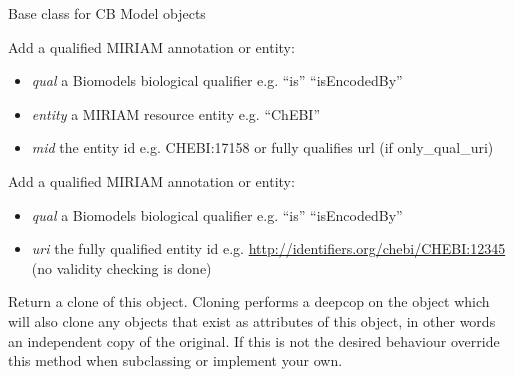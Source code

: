 \documentclass[a4paper,11pt,english]{sphinxmanual}
\begin{document}
\begin{fulllineitems}
\label{modules_doc:cbmpy.CBModel.Fbase}
Base class for CB Model objects

\begin{fulllineitems}
\label{modules_doc:cbmpy.CBModel.Fbase.addMIRIAMannotation}
Add a qualified MIRIAM annotation or entity:
\begin{itemize}
\item {} 
\emph{qual} a Biomodels biological qualifier e.g. ``is'' ``isEncodedBy''

\item {} 
\emph{entity} a MIRIAM resource entity e.g. ``ChEBI''

\item {} 
\emph{mid} the entity id e.g. CHEBI:17158 or fully qualifies url (if only\_qual\_uri)

\end{itemize}

\end{fulllineitems}


\begin{fulllineitems}
\label{modules_doc:cbmpy.CBModel.Fbase.addMIRIAMuri}
Add a qualified MIRIAM annotation or entity:
\begin{itemize}
\item {} 
\emph{qual} a Biomodels biological qualifier e.g. ``is'' ``isEncodedBy''

\item {} 
\emph{uri} the fully qualified entity id e.g. \url{http://identifiers.org/chebi/CHEBI:12345} (no validity checking is done)

\end{itemize}

\end{fulllineitems}


\begin{fulllineitems}
\label{modules_doc:cbmpy.CBModel.Fbase.clone}
Return a clone of this object. Cloning performs a deepcop on the object which will also clone
any objects that exist as attributes of this object, in other words an independent copy of the
original. If this is not the desired behaviour override this method when subclassing or implement
your own.


\end{fulllineitems}
\end{fulllineitems}
\end{document}
